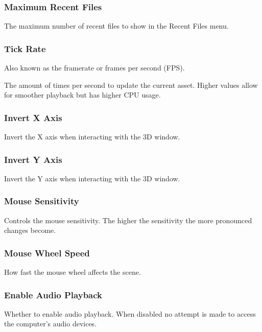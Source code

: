 \documentclass[10pt, a4paper, titlepage, oneside]{article}
\begin{document}
\subsubsection{Maximum Recent Files}

The maximum number of recent files to show in the Recent Files menu.

\subsubsection{Tick Rate}

Also known as the framerate or frames per second (FPS).

The amount of times per second to update the current asset. Higher values allow for smoother playback but has higher CPU usage.

\newpage

\subsubsection{Invert X Axis}

Invert the X axis when interacting with the 3D window.

\subsubsection{Invert Y Axis}

Invert the Y axis when interacting with the 3D window.

\subsubsection{Mouse Sensitivity}

Controls the mouse sensitivity. The higher the sensitivity the more pronounced changes become.

\subsubsection{Mouse Wheel Speed}

How fast the mouse wheel affects the scene.

\subsubsection{Enable Audio Playback}

Whether to enable audio playback. When disabled no attempt is made to access the computer's audio devices.
\end{document}
